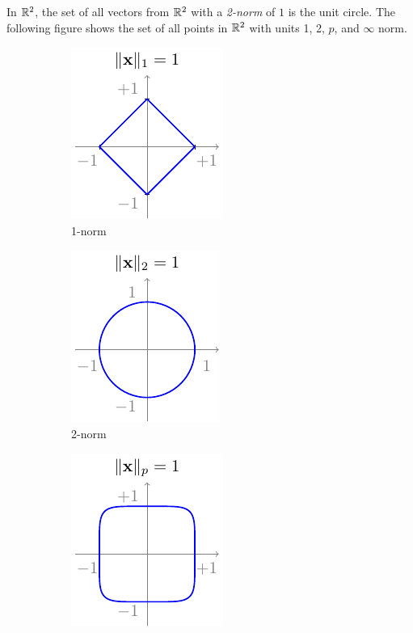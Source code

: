 In $\mathbb{R}^2$, the set of all vectors from $\mathbb{R}^2$ with a \textit{2-norm} of $1$ is the unit circle. The following figure shows the set of all points in $\mathbb{R}^2$ with units 1, 2, $p$, and $\infty$ norm.
\begin{figure}[h]
    \centering
    \begin{subfigure}[b]{0.24\textwidth}
        \includegraphics{figure/chapter01/norm1.pdf}
        \caption{1-norm}
        \label{fig:ch01-norm1}
    \end{subfigure}
    \begin{subfigure}[b]{0.24\textwidth}
        \centering
        \includegraphics{figure/chapter01/norm2.pdf}
        \caption{2-norm}
        \label{fig:ch01-norm2}
    \end{subfigure}
    \begin{subfigure}[b]{0.24\textwidth}
        \centering
        \includegraphics{figure/chapter01/normp.pdf}

\end{subfigure}
\end{figure}
